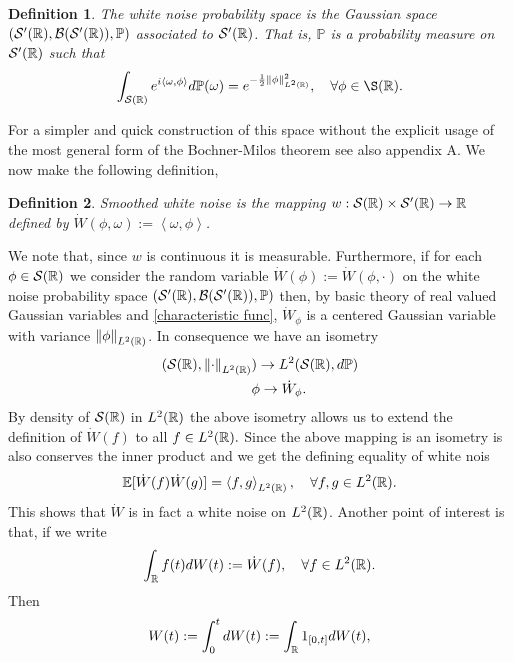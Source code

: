 \documentclass[12pt]{article}
\newtheorem{definition}{Definition}
\newcommand{\br}[1]{\left\langle#1\right\rangle}
\begin{document}
\begin{definition}
	The \emph{white noise probability space} is the Gaussian space $({\mathcal S}'({\mathbb R}),\mathcal{B}({\mathcal S}'({\mathbb R})),\mathbb{P} )$ associated to ${\mathcal S}'({\mathbb R})$. That is, $\mathbb{P} $ is a probability measure on ${\mathcal S}'({\mathbb R})$ such that
	\begin{equation}\label{characteristic func}
		\int_{\Ss(\R)} e^{i\br{\omega,\phi}}d \mathbb{P}(\omega)=e^{-\frac{1}{2}\norm{\phi}_{L^2(\R)}^2},\quad\forall \phi\in \S(\R).
	\end{equation}
\end{definition}
For a simpler and quick construction of this space without the explicit usage of the most general form of the Bochner-Milos theorem see also \cite{holden1996stochastic} appendix A.
We now make the following definition,
\begin{definition}
	\emph{Smoothed} white noise is the mapping $w:{\mathcal S}({\mathbb R})\times{\mathcal S}'({\mathbb R})\to {\mathbb R}$ defined by $\dot{W}(\phi,\omega):=\br{\omega,\phi}$.
\end{definition}
We note that, since $w$ is continuous it is measurable. Furthermore, if for each $\phi\in {\mathcal S}({\mathbb R})$ we consider the random variable   $\dot{W}(\phi):=\dot{W}(\phi,\cdot )$ on the white noise probability space $({\mathcal S}'({\mathbb R}),\mathcal{B}({\mathcal S}'({\mathbb R})),\mathbb{P} )$ then, by basic theory of real valued Gaussian variables and \eqref{characteristic func}, $\dot{W}_\phi$ is a centered Gaussian variable with variance $\norm{\phi}_{L^2({\mathbb R})}$. In consequence we have an isometry
\begin{align*}
	({\mathcal S}({\mathbb R}),\norm{\cdot }  _{L^2({\mathbb R})} & )\to L^2({\mathcal S}({\mathbb R}),d\mathbb{P}) \\
	                                   & \phi\to \dot{W}_\phi.
\end{align*}
By density of ${\mathcal S}({\mathbb R})$ in $L^2({\mathbb R})$ the above isometry allows us to extend the definition of $\dot{W}(f)$ to all $f\in L^2({\mathbb R}).$ Since the above mapping is an isometry is also conserves the inner product and we get the defining equality of white nois
\begin{equation*}
	\E[\dot{W}(f)\dot{W}(g)]=\br{f,g}_{L^2(\R)},\quad\forall f,g\in L^2(\R).
\end{equation*}
This shows that $\dot{W}$ is in fact a white noise on $L^2({\mathbb R})$. Another point of interest is that, if we write
\begin{equation}\label{iso}
	\int_{{\mathbb R}}f(t) dW(t):=\dot{W}(f),\quad\forall f\in L^2({\mathbb R}).
\end{equation}
Then
\begin{equation*}
	W(t):=\int_{0}^t dW(t):= \int_{{\mathbb R}}1_{[0,t]} dW(t),
\end{equation*}
\end{document}
